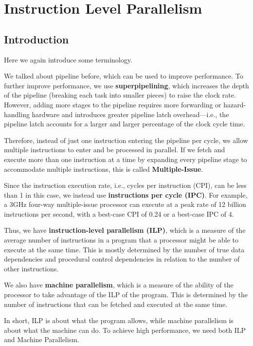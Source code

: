 \chapter{Instruction Level Parallelism}

\section{Introduction}
Here we again introduce some terminology.

We talked about pipeline before, which can be used to improve performance. To further improve performance, we use \textbf{superpipelining}, which increases the depth of the pipeline (breaking each task into smaller pieces) to raise the clock rate. However, adding more stages to the pipeline requires more forwarding or hazard-handling hardware and introduces greater pipeline latch overhead—i.e., the pipeline latch accounts for a larger and larger percentage of the clock cycle time.

Therefore, instead of just one instruction entering the pipeline per cycle, we allow multiple instructions to enter and be processed in parallel. If we fetch and execute more than one instruction at a time by expanding every pipeline stage to accommodate multiple instructions, this is called \textbf{Multiple-Issue}.

Since the instruction execution rate, i.e., cycles per instruction (CPI), can be less than 1 in this case, we instead use \textbf{instructions per cycle (IPC)}. For example, a 3GHz four-way multiple-issue processor can execute at a peak rate of 12 billion instructions per second, with a best-case CPI of 0.24 or a best-case IPC of 4.

Thus, we have \textbf{instruction-level parallelism (ILP)}, which is a measure of the average number of instructions in a program that a processor might be able to execute at the same time. This is mostly determined by the number of true data dependencies and procedural control dependencies in relation to the number of other instructions. 

We also have \textbf{machine parallelism}, which is a measure of the ability of the processor to take advantage of the ILP of the program. This is determined by the number of instructions that can be fetched and executed at the same time.

In short, ILP is about what the program allows, while machine parallelism is about what the machine can do. To achieve high performance, we need both ILP and Machine Parallelism. 

